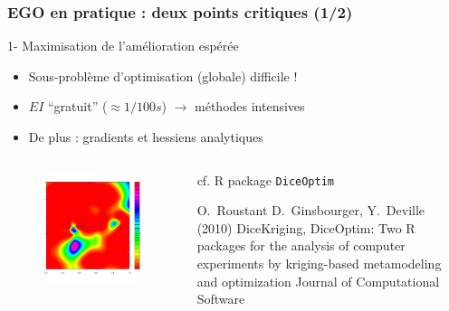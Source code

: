 \begin{frame}
\frametitle{EGO en pratique : deux points critiques (1/2)}

\begin{block}{1- Maximisation de l'amélioration espérée}
\begin{itemize}
 \item Sous-problème d'optimisation (globale) difficile !
 \item $EI$ ``gratuit'' ($\approx 1/100s$) $\rightarrow$ méthodes intensives
 \item De plus : gradients et hessiens analytiques
\end{itemize}
\end{block}

\begin{columns}
 \begin{column}{.5\textwidth}

\begin{figure}[h!]  \centering	
\includegraphics[trim=1mm 15mm 20mm 20mm, clip, width=.7\textwidth]{fig/AEI.png} 
\end{figure}  
 \end{column}
 \begin{column}{.5\textwidth}
\begin{block}{cf. R package \texttt{DiceOptim}}
\scriptsize{
 \begin{thebibliography}{7}
\beamertemplatearticlebibitems
     O.~Roustant D.~Ginsbourger, Y.~Deville (2010)
         \newblock DiceKriging, DiceOptim: Two R packages for the analysis of computer experiments by kriging-based metamodeling and optimization  
         \newblock Journal of Computational Software
 \end{thebibliography}
}
\end{block}
 \end{column}
\end{columns}
\end{frame}

